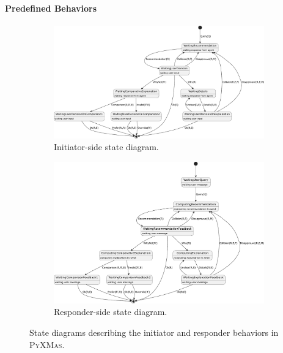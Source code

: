 \paragraph{Predefined Behaviors}
%
\begin{figure}
    \centering
    \begin{subfigure}[t]{\linewidth}
        \centering
        \includegraphics[width=\linewidth]{figures/pyxmas/user-state-diagram}
        \caption{
            Initiator-side state diagram.
        }
        \label{fig:user-state-diagram}
    \end{subfigure}
    \begin{subfigure}[t]{\linewidth}
        \centering
        \includegraphics[width=\linewidth]{figures/pyxmas/agent-state-diagram}
        \caption{
            Responder-side state diagram.
        }
        \label{fig:agent-state-diagram}
    \end{subfigure}
    \caption{
        State diagrams describing the initiator and responder behaviors in \textsc{PyXMas}.
    }
    \label{fig:state-diagrams}
\end{figure}
